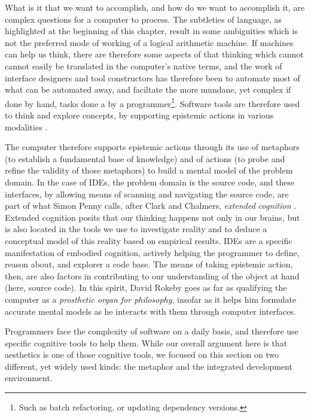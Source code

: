 What is it that we want to accomplish, and how do we want to accomplish it, are complex questions for a computer to process. The subtleties of language, as highlighted at the beginning of this chapter, result in some ambiguities which is not the preferred mode of working of a logical arithmetic machine. If machines can help us think, there are therefore some aspects of that thinking which cannot cannot easily be translated in the computer's native terms, and the work of interface designers and tool constructors has therefore been to automate most of what can be automated away, and faciltate the more mundane, yet complex if done by hand, tasks done a by a programmer\footnote{Such as batch refactoring, or updating dependency versions.}. Software tools are therefore used to think and explore concepts, by supporting epistemic actions in various modalities \citep{victor_humane_2014}.

The computer therefore supports epistemic actions through its use of metaphors (to establish a fundamental base of knowledge) and of actions (to probe and refine the validity of those metaphors) to build a mental model of the problem domain. In the case of IDEs, the problem domain is the source code, and these interfaces, by allowing means of scanning and navigating the source code, are part of what Simon Penny calls, after Clark and Chalmers, \emph{extended cognition} \citep{penny_making_2019}. Extended cognition posits that our thinking happens not only in our brains, but is also located in the tools we use to investigate reality and to deduce a conceptual model of this reality based on empirical results. IDEs are a specific manifestation of embodied cognition, actively helping the programmer to define, reason about, and explorer a code base. The means of taking epistemic action, then, are also factors in contributing to our understanding of the object at hand (here, source code). In this spirit, David Rokeby goes as far as qualifying the computer as a \emph{prosthetic organ for philosophy}, insofar as it helps him formulate accurate mental models as he interacts with them through computer interfaces.

\vspace{1\baselineskip}

Programmers face the complexity of software on a daily basis, and therefore use specific cognitive tools to help them. While our overall argument here is that aesthetics is one of those cognitive tools, we focused on this section on two different, yet widely used kinds: the metaphor and the integrated development environment.

